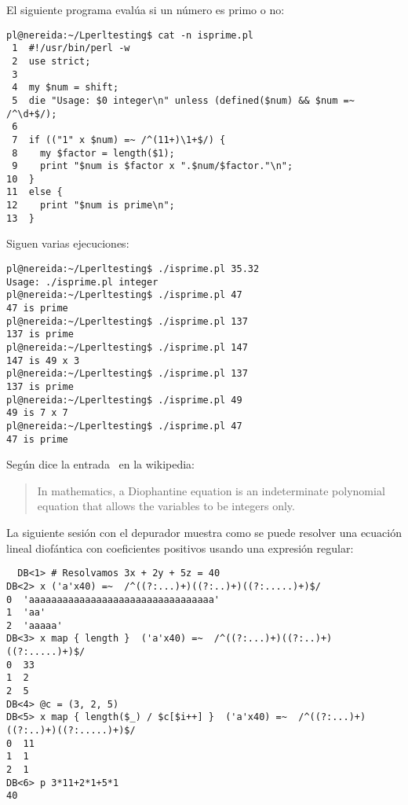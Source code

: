 El siguiente programa evalúa si un número es primo o no:
\begin{verbatim}
pl@nereida:~/Lperltesting$ cat -n isprime.pl
 1  #!/usr/bin/perl -w
 2  use strict;
 3
 4  my $num = shift;
 5  die "Usage: $0 integer\n" unless (defined($num) && $num =~ /^\d+$/);
 6
 7  if (("1" x $num) =~ /^(11+)\1+$/) {
 8    my $factor = length($1);
 9    print "$num is $factor x ".$num/$factor."\n";
10  }
11  else {
12    print "$num is prime\n";
13  }
\end{verbatim}
Siguen varias ejecuciones:
\begin{verbatim}
pl@nereida:~/Lperltesting$ ./isprime.pl 35.32
Usage: ./isprime.pl integer
pl@nereida:~/Lperltesting$ ./isprime.pl 47
47 is prime
pl@nereida:~/Lperltesting$ ./isprime.pl 137
137 is prime
pl@nereida:~/Lperltesting$ ./isprime.pl 147
147 is 49 x 3
pl@nereida:~/Lperltesting$ ./isprime.pl 137
137 is prime
pl@nereida:~/Lperltesting$ ./isprime.pl 49
49 is 7 x 7
pl@nereida:~/Lperltesting$ ./isprime.pl 47
47 is prime
\end{verbatim}



Según dice la entrada \ en la wikipedia:

\begin{it}
\begin{quotation}
In mathematics, a Diophantine equation is an indeterminate polynomial equation that allows the variables to be integers only. 
\end{quotation}
\end{it}

La siguiente sesión con el depurador muestra como se puede 
resolver una ecuación lineal diofántica con coeficientes 
positivos usando una expresión regular:

\begin{verbatim}
  DB<1> # Resolvamos 3x + 2y + 5z = 40
DB<2> x ('a'x40) =~  /^((?:...)+)((?:..)+)((?:.....)+)$/
0  'aaaaaaaaaaaaaaaaaaaaaaaaaaaaaaaaa'
1  'aa'
2  'aaaaa'
DB<3> x map { length }  ('a'x40) =~  /^((?:...)+)((?:..)+)((?:.....)+)$/
0  33
1  2
2  5
DB<4> @c = (3, 2, 5)
DB<5> x map { length($_) / $c[$i++] }  ('a'x40) =~  /^((?:...)+)((?:..)+)((?:.....)+)$/
0  11
1  1
2  1
DB<6> p 3*11+2*1+5*1
40
\end{verbatim}



